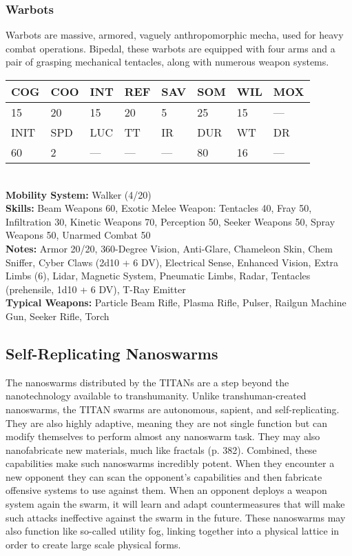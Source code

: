 \subsubsection{Warbots} 

Warbots are massive, armored, vaguely anthropomorphic mecha, used for heavy combat operations. Bipedal, these warbots are equipped with four arms and a pair of grasping mechanical tentacles, along with numerous weapon systems. \\ \begin{tabular}{|l|l|l|l|l|l|l|l|} \hline

COG &COO &INT &REF &SAV &SOM &WIL &MOX \\ \hline

15 &20 &15 &20 &5 &25 &15 &— \\ \hline

INIT &SPD &LUC &TT &IR &DUR &WT &DR \\ \hline

60 &2 &— &— &— &80 &16 &— \\ \hline

\end{tabular} \\ \textbf{Mobility System: }Walker (4/20) \\ \textbf{Skills:} Beam Weapons 60, Exotic Melee Weapon: Tentacles 40, Fray 50, Infiltration 30, Kinetic Weapons 70, Perception 50, Seeker Weapons 50, Spray Weapons 50, Unarmed Combat 50 \\ \textbf{Notes:} Armor 20/20, 360-Degree Vision, Anti-Glare, Chameleon Skin, Chem Sniffer, Cyber Claws (2d10 + 6 DV), Electrical Sense, Enhanced Vision, Extra Limbs (6), Lidar, Magnetic System, Pneumatic Limbs, Radar, Tentacles (prehensile, 1d10 + 6 DV), T-Ray Emitter \\ \textbf{Typical Weapons:} Particle Beam Rifle, Plasma Rifle, Pulser, Railgun Machine Gun, Seeker Rifle, Torch 



\subsection{Self-Replicating Nanoswarms} 

The nanoswarms distributed by the TITANs are a step beyond the nanotechnology available to transhumanity. Unlike transhuman-created nanoswarms, the TITAN swarms are autonomous, sapient, and self-replicating. They are also highly adaptive, meaning they are not single function but can modify themselves to perform almost any nanoswarm task. They may also nanofabricate new materials, much like fractals (p. 382). Combined, these capabilities make such nanoswarms incredibly potent. When they encounter a new opponent they can scan the opponent's capabilities and then fabricate offensive systems to use against them. When an opponent deploys a weapon system again the swarm, it will learn and adapt countermeasures that will make such attacks ineffective against the swarm in the future. These nanoswarms may also function like so-called utility fog, linking together into a physical lattice in order to create large scale physical forms. 

